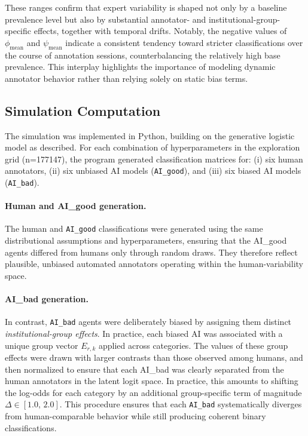 \documentclass[12pt]{article}
\begin{document}
These ranges confirm that expert variability is shaped not only by a baseline prevalence 
level but also by substantial annotator- and institutional-group-specific effects, together with temporal 
drifts. Notably, the negative values of \(\phi_{\text{mean}}\) and \(\psi_{\text{mean}}\) 
indicate a consistent tendency toward stricter classifications over the course of annotation 
sessions, counterbalancing the relatively high base prevalence. This interplay highlights 
the importance of modeling dynamic annotator behavior rather than relying solely on static 
bias terms.


\subsection{Simulation Computation}
\label{sec:simulation-computation}

The simulation was implemented in Python, building on the generative logistic model as described. For each combination of hyperparameters in the
exploration grid (n=177147), the program generated classification matrices for:
(i) six human annotators, (ii) six unbiased AI models (\texttt{AI\_good}), and
(iii) six biased AI models (\texttt{AI\_bad}).

\paragraph{Human and AI\_good generation.}
The human and \texttt{AI\_good} classifications were generated using the same
distributional assumptions and hyperparameters, ensuring that the AI\_good agents
differed from humans only through random draws. They therefore reflect plausible,
unbiased automated annotators operating within the human-variability space.

\paragraph{AI\_bad generation.}
In contrast, \texttt{AI\_bad} agents were deliberately biased by assigning them
distinct \emph{institutional-group effects}. In practice, each biased AI was associated with a
unique group vector $E_{r,k}$ applied across categories. The values of these
group effects were drawn with larger contrasts than those observed among humans,
and then normalized to ensure that each AI\_bad was clearly separated from the
human annotators in the latent logit space. In practice, this amounts to shifting
the log-odds for each category by an additional group-specific term of magnitude
$\Delta \in [1.0,\,2.0]$. This procedure ensures that
each \texttt{AI\_bad} systematically diverges from human-comparable behavior while still
producing coherent binary classifications.
\end{document}
